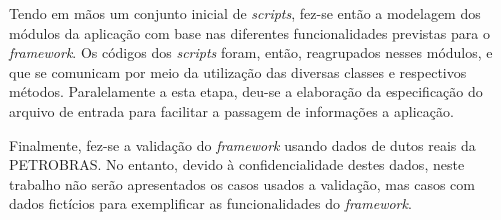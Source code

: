 Tendo em mãos um conjunto inicial de \textit{scripts}, fez-se então a modelagem dos módulos da aplicação com base nas diferentes funcionalidades previstas para o \textit{framework}.
Os códigos dos \textit{scripts} foram, então, reagrupados nesses módulos, e que se comunicam por meio da utilização das diversas classes e respectivos métodos.
Paralelamente a esta etapa, deu-se a elaboração da especificação do arquivo de entrada para facilitar a passagem de informações a aplicação.

Finalmente, fez-se a validação do \textit{framework} usando dados de dutos reais da PETROBRAS\@.
No entanto, devido à confidencialidade destes dados, neste trabalho não serão apresentados os casos usados a validação, mas casos com dados fictícios para exemplificar as funcionalidades do \textit{framework}.